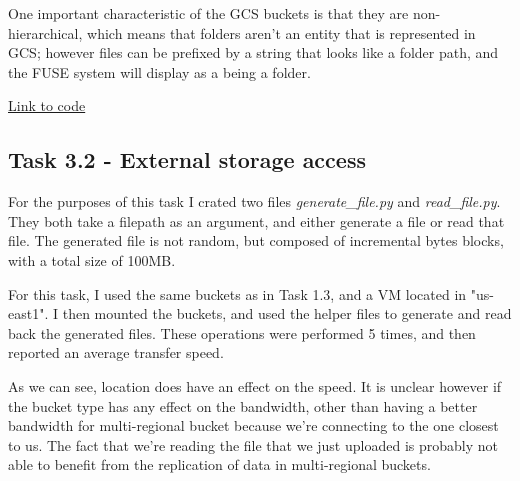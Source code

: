 \documentclass[paper=a4, fontsize=11pt]{scrartcl}
\numberwithin{equation}{section}    %
\numberwithin{figure}{section}      %
\numberwithin{table}{section}       %
\begin{document}
One important characteristic of the GCS buckets is that they are non-hierarchical, which means that folders aren't an entity that is represented in GCS; however files can be prefixed by a string that looks like a folder path, and the FUSE system will display as a being a folder.

\href{https://github.com/valenting/id2210-cloud-project-2018/blob/master/startup_script.sh}{Link to code}

\subsection{Task 3.2 - External storage access}

For the purposes of this task I crated two files \textit{generate\_file.py} and \textit{read\_file.py}. They both take a filepath as an argument, and either generate a file or read that file. The generated file is not random, but composed of incremental bytes blocks, with a total size of 100MB.

For this task, I used the same buckets as in Task 1.3, and a VM located in "us-east1".
I then mounted the buckets, and used the helper files to generate and read back the generated files. These operations were performed 5 times, and then reported an average transfer speed.

As we can see, location does have an effect on the speed. It is unclear however if the bucket type has any effect on the bandwidth, other than having a better bandwidth for multi-regional bucket because we're connecting to the one closest to us. The fact that we're reading the file that we just uploaded is probably not able to benefit from the replication of data in multi-regional buckets.
\end{document}
